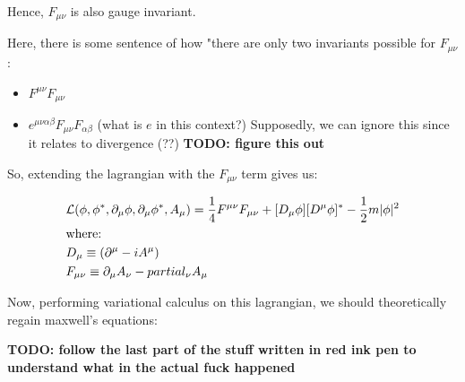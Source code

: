 Hence, $F_{\mu \nu}$ is also gauge invariant.

Here, there is some sentence of how "there are only two invariants possible
for $F_{\mu \nu}$:

\begin{itemize}
    \item $F^{\mu \nu} F_{\mu \nu}$
    \item $e^{\mu \nu \alpha \beta} F_{\mu \nu} F_{\alpha \beta}$ (what is $e$ in this context?)
        Supposedly, we can ignore this since it relates to divergence (??)
        \textbf{TODO: figure this out}
\end{itemize}

So, extending the lagrangian with the $F_{\mu \nu}$ term gives us:

\begin{align*}
    &\mathcal{L} (\phi, \phi^*, \partial_\mu \phi, \partial_\mu \phi^*, A_\mu) =
    \frac{1}{4} F^{\mu \nu} F_{\mu \nu} + [D_\mu \phi][D^\mu \phi]^* - \frac{1}{2} m |\phi|^2 \\
    &\text{where:}\\
    &D_\mu \equiv (\partial^\mu - i A^\mu) \\
    &F_{\mu\nu} \equiv \partial_\mu A_\nu - partial_\nu A_\mu
\end{align*}

Now, performing variational calculus on this lagrangian, we should theoretically
regain maxwell's equations:

\textbf{TODO: follow the last part of the stuff written in red ink pen to
understand what in the actual fuck happened}

